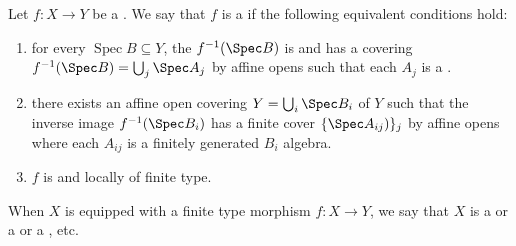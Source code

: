 \begin{definition} \label{definition:finite_type_morphism_of_schemes}
Let $f : X \to Y$ be a . 
We say that $f$ is a  if the following equivalent conditions hold:
\begin{enumerate}
    \item for every  $ \operatorname{Spec} B \subseteq Y$, the  $f^{-1}(\Spec B)$ is  and has a covering $f^{-1}(\Spec B) = \bigcup_j \Spec A_j$ by affine opens such that each $A_j$ is a .

    \item there exists an affine open covering $Y = \bigcup_i \Spec B_i$ of $Y$ such that the inverse image $f^{-1}(\Spec B_i)$ has a finite cover $\{\Spec A_{ij}) \}_j$ by affine opens where each $A_{ij}$ is a finitely generated $B_i$ algebra. 

    \item $f$ is  and locally of finite type. 
\end{enumerate}
When $X$ is equipped with a finite type morphism $f: X \to Y$, we say that $X$ is a  or a  or a  , etc.
\end{definition}
